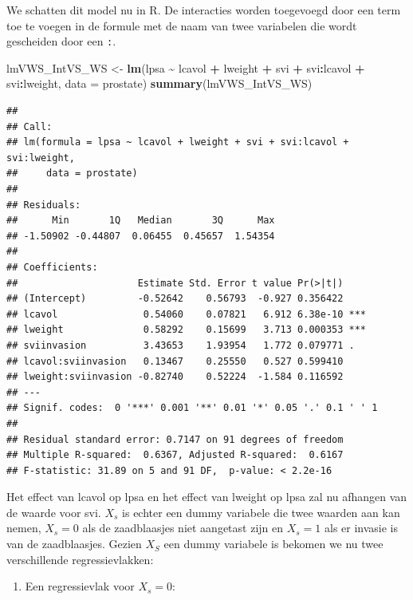 \documentclass[
  12pt,dutch]{book}
\newenvironment{Shaded}{\begin{snugshade}}{\end{snugshade}}
\newcommand{\AttributeTok}[1]{\textcolor[rgb]{0.13,0.29,0.53}{#1}}
\newcommand{\FunctionTok}[1]{\textcolor[rgb]{0.13,0.29,0.53}{\textbf{#1}}}
\newcommand{\NormalTok}[1]{#1}
\newcommand{\OtherTok}[1]{\textcolor[rgb]{0.56,0.35,0.01}{#1}}
\newcommand{\SpecialCharTok}[1]{\textcolor[rgb]{0.81,0.36,0.00}{\textbf{#1}}}
\providecommand{\tightlist}{%
  \setlength{\itemsep}{0pt}\setlength{\parskip}{0pt}}
\theoremstyle{definition}
\theoremstyle{definition}
\theoremstyle{definition}
\theoremstyle{definition}
\theoremstyle{remark}
\begin{document}
We schatten dit model nu in R. De interacties worden toegevoegd door een term toe te voegen in de formule met de naam van twee variabelen die wordt gescheiden door een \texttt{:}.

\begin{Shaded}
\begin{Highlighting}[]
\NormalTok{lmVWS\_IntVS\_WS }\OtherTok{\textless{}{-}} \FunctionTok{lm}\NormalTok{(lpsa }\SpecialCharTok{\textasciitilde{}}\NormalTok{ lcavol }\SpecialCharTok{+}\NormalTok{ lweight }\SpecialCharTok{+}\NormalTok{ svi }\SpecialCharTok{+}
\NormalTok{    svi}\SpecialCharTok{:}\NormalTok{lcavol }\SpecialCharTok{+}\NormalTok{ svi}\SpecialCharTok{:}\NormalTok{lweight, }\AttributeTok{data =}\NormalTok{ prostate)}
\FunctionTok{summary}\NormalTok{(lmVWS\_IntVS\_WS)}
\end{Highlighting}
\end{Shaded}

\begin{verbatim}
## 
## Call:
## lm(formula = lpsa ~ lcavol + lweight + svi + svi:lcavol + svi:lweight, 
##     data = prostate)
## 
## Residuals:
##      Min       1Q   Median       3Q      Max 
## -1.50902 -0.44807  0.06455  0.45657  1.54354 
## 
## Coefficients:
##                     Estimate Std. Error t value Pr(>|t|)    
## (Intercept)         -0.52642    0.56793  -0.927 0.356422    
## lcavol               0.54060    0.07821   6.912 6.38e-10 ***
## lweight              0.58292    0.15699   3.713 0.000353 ***
## sviinvasion          3.43653    1.93954   1.772 0.079771 .  
## lcavol:sviinvasion   0.13467    0.25550   0.527 0.599410    
## lweight:sviinvasion -0.82740    0.52224  -1.584 0.116592    
## ---
## Signif. codes:  0 '***' 0.001 '**' 0.01 '*' 0.05 '.' 0.1 ' ' 1
## 
## Residual standard error: 0.7147 on 91 degrees of freedom
## Multiple R-squared:  0.6367, Adjusted R-squared:  0.6167 
## F-statistic: 31.89 on 5 and 91 DF,  p-value: < 2.2e-16
\end{verbatim}

Het effect van lcavol op lpsa en het effect van lweight op lpsa zal nu afhangen van de waarde voor svi.
\(X_s\) is echter een dummy variabele die twee waarden aan kan nemen, \(X_s=0\) als de zaadblaasjes niet aangetast zijn en \(X_s=1\) als er invasie is van de zaadblaasjes.
Gezien \(X_S\) een dummy variabele is bekomen we nu twee verschillende regressievlakken:

\begin{enumerate}
\def\labelenumi{\arabic{enumi}.}
\tightlist
\item
  Een regressievlak voor \(X_s=0\):
\end{enumerate}
\end{document}
